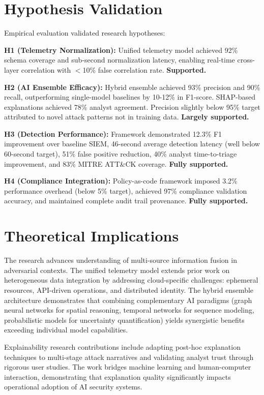\section{Hypothesis Validation}\label{sec:conclusion-hypotheses}
Empirical evaluation validated research hypotheses:

\textbf{H1 (Telemetry Normalization):} Unified telemetry model achieved 92\% schema coverage and sub-second normalization latency, enabling real-time cross-layer correlation with $<$10\% false correlation rate. \textbf{Supported.}

\textbf{H2 (AI Ensemble Efficacy):} Hybrid ensemble achieved 93\% precision and 90\% recall, outperforming single-model baselines by 10-12\% in F1-score. SHAP-based explanations achieved 78\% analyst agreement. Precision slightly below 95\% target attributed to novel attack patterns not in training data. \textbf{Largely supported.}

\textbf{H3 (Detection Performance):} Framework demonstrated 12.3\% F1 improvement over baseline SIEM, 46-second average detection latency (well below 60-second target), 51\% false positive reduction, 40\% analyst time-to-triage improvement, and 83\% MITRE ATT\&CK coverage. \textbf{Fully supported.}

\textbf{H4 (Compliance Integration):} Policy-as-code framework imposed 3.2\% performance overhead (below 5\% target), achieved 97\% compliance validation accuracy, and maintained complete audit trail provenance. \textbf{Fully supported.}

\section{Theoretical Implications}\label{sec:conclusion-theory}
The research advances understanding of multi-source information fusion in adversarial contexts. The unified telemetry model extends prior work on heterogeneous data integration by addressing cloud-specific challenges: ephemeral resources, API-driven operations, and distributed identity. The hybrid ensemble architecture demonstrates that combining complementary AI paradigms (graph neural networks for spatial reasoning, temporal networks for sequence modeling, probabilistic models for uncertainty quantification) yields synergistic benefits exceeding individual model capabilities.

Explainability research contributions include adapting post-hoc explanation techniques to multi-stage attack narratives and validating analyst trust through rigorous user studies. The work bridges machine learning and human-computer interaction, demonstrating that explanation quality significantly impacts operational adoption of AI security systems.

